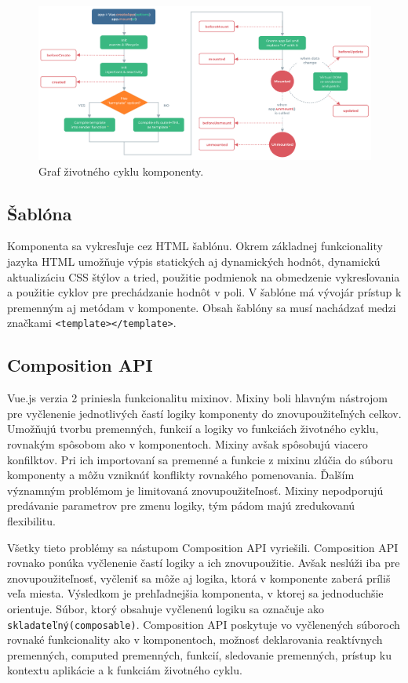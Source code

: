     \begin{figure}[!hbt]
        \centering
        \includegraphics[scale=0.3]{obrazky/lifecycle.png}
        \caption{Graf životného cyklu komponenty\cite{vue-guide}.}
        \label{pic:hooks}
    \end{figure}

\subsection*{Šablóna}
Komponenta sa vykresľuje cez HTML šablónu. Okrem základnej funkcionality jazyka HTML umožňuje výpis statických aj dynamických hodnôt, dynamickú aktualizáciu CSS štýlov a tried, použitie podmienok na obmedzenie vykresľovania a použitie cyklov pre prechádzanie hodnôt v poli. V šablóne má vývojár prístup k premenným aj metódam v komponente. Obsah šablóny sa musí nachádzať medzi značkami \texttt{<template></template>}.

\subsection{Composition API}
\label{compositionapi}
Vue.js verzia 2 priniesla funkcionalitu mixinov. Mixiny boli hlavným nástrojom pre vyčlenenie jednotlivých častí logiky komponenty do znovupoužiteľných celkov. Umožňujú tvorbu premenných, funkcií a logiky vo funkciách životného cyklu, rovnakým spôsobom ako v komponentoch. Mixiny avšak spôsobujú viacero konfilktov. Pri ich importovaní sa premenné a funkcie z mixinu zlúčia do súboru komponenty a môžu vzniknúť konflikty rovnakého pomenovania. Ďalším významným problémom je limitovaná znovupoužiteľnosť. Mixiny nepodporujú predávanie parametrov pre zmenu logiky, tým pádom majú zredukovanú flexibilitu.

Všetky tieto problémy sa nástupom Composition API vyriešili. Composition API rovnako ponúka vyčlenenie častí logiky a ich znovupoužitie. Avšak neslúži iba pre znovupoužiteľnosť, vyčleniť sa môže aj logika, ktorá v komponente zaberá príliš veľa miesta.  Výsledkom je prehľadnejšia komponenta, v ktorej sa jednoduchšie orientuje. Súbor, ktorý obsahuje vyčlenenú logiku sa označuje ako \texttt{skladateľný(composable)}. Composition API poskytuje vo vyčlenených súboroch rovnaké funkcionality ako v komponentoch, možnosť deklarovania reaktívnych premenných, computed premenných, funkcií, sledovanie premenných, prístup ku kontextu aplikácie a k funkciám životného cyklu.

